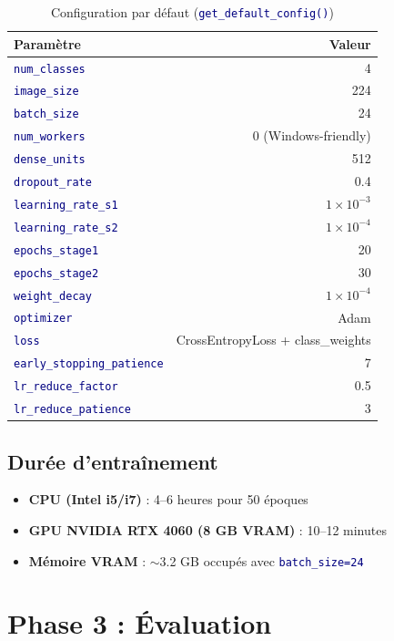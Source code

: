\documentclass[11pt,a4paper,oneside]{report}
\newcommand{\code}[1]{\texttt{\textcolor{navy}{#1}}}
\begin{document}
\begin{table}[!htbp]
\centering
\caption{Configuration par défaut (\code{get\_default\_config()})}
\begin{tabular}{lr}
\toprule
\textbf{Paramètre} & \textbf{Valeur} \\
\midrule
\code{num\_classes} & 4 \\
\code{image\_size} & 224 \\
\code{batch\_size} & 24 \\
\code{num\_workers} & 0 (Windows-friendly) \\
\code{dense\_units} & 512 \\
\code{dropout\_rate} & 0.4 \\
\code{learning\_rate\_s1} & $1\!\times\!10^{-3}$ \\
\code{learning\_rate\_s2} & $1\!\times\!10^{-4}$ \\
\code{epochs\_stage1} & 20 \\
\code{epochs\_stage2} & 30 \\
\code{weight\_decay} & $1\!\times\!10^{-4}$ \\
\code{optimizer} & Adam \\
\code{loss} & CrossEntropyLoss + class\_weights \\
\code{early\_stopping\_patience} & 7 \\
\code{lr\_reduce\_factor} & 0.5 \\
\code{lr\_reduce\_patience} & 3 \\
\bottomrule
\end{tabular}
\end{table}

\section{Durée d'entraînement}

\begin{itemize}
\item \textbf{CPU (Intel i5/i7)} : 4--6 heures pour 50 époques
\item \textbf{GPU NVIDIA RTX 4060 (8 GB VRAM)} : 10--12 minutes
\item \textbf{Mémoire VRAM} : $\sim$3.2 GB occupés avec \code{batch\_size=24}
\end{itemize}

\chapter{Phase 3 : Évaluation}
\end{document}
